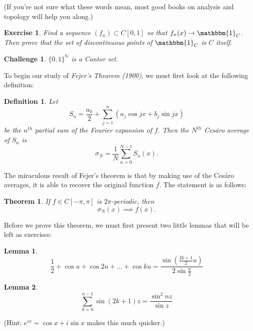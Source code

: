 \documentclass{article}
\newtheorem{thm}{Theorem}[section]
\newtheorem{defn}{Definition}[section]
\newtheorem{lem}{Lemma}[section]
\newtheorem{exer}{Exercise}[section]
\newtheorem{chal}{Challenge}[section]
\begin{document}
(If you're not sure what these words mean, most good books on analysis and topology will help you along.)

\begin{exer}
Find a sequence $(f_{n}) \subset C[0,1]$ so that $f_{n}(x) \rightarrow \mathbbm{1}_{C}$. Then prove that the set of discontinuous points of $\mathbbm{1}_{C}$ is $C$ itself.
\end{exer}

\begin{chal}
$\{ {0,1} \}^{\mathbb{N}}$ is a Cantor set.
\end{chal}

To begin our study of \textit{Fejer's Theorem (1900)}, we must first look at the following definition:
\begin{defn}
Let $$S_{n} = \frac{a_{0}}{2} + \sum_{j=1}^{n} (a_{j} \cos jx + b_{j} \sin jx)$$ be the $n^{th}$ partial sum of the Fourier expansion of $f$.  Then the $N^{th}$ Ces\'{a}ro average of $S_{n}$ is 
$$\sigma_{N} = \frac{1}{N} \sum_{n=0}^{N-1} S_{n}(x).$$
\end{defn}

The miraculous result of Fejer's theorem is that by making use of the Ces\'{a}ro averages, it is able to recover the original function $f$.  The statement is as follows:
\begin{thm}
If $f \in C[-\pi, \pi]$ is $2\pi$-periodic, then 
$$ \sigma_{N}(x) \implies f(x).$$
\end{thm}

Before we prove this theorem, we must first present two little lemmas that will be left as exercises:
\begin{lem}
\begin{equation}
\frac{1}{2} + \cos u + \cos 2u + \ldots + \cos ku = \frac{\sin (\frac{2k+1}{2} u)}{2\sin \frac{u}{2}}
\end{equation}
\end{lem}
\begin{lem}
\begin{equation}
\sum_{k=0}^{n-1} \sin (2k+1)z = \frac{\sin^{2}nz}{\sin z} 
\end{equation}
\end{lem}
(Hint: $e^{ix} = \cos x + i \sin x$ makes this much quicker.)
\end{document}

